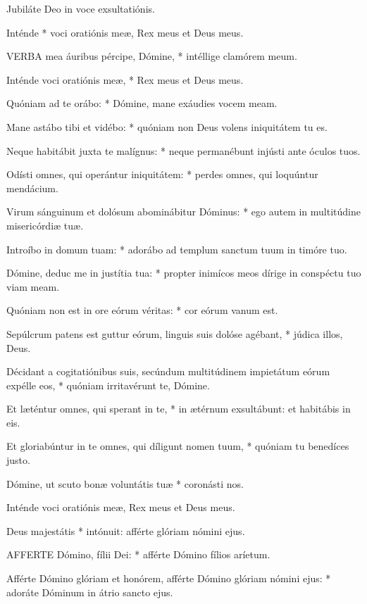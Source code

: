  Jubiláte Deo in voce exsultatiónis.

 Inténde * voci oratiónis meæ, Rex meus et Deus meus.


\lettrine[lines=2]{V}{ERBA} mea áuribus pércipe, Dómine, * intéllige clamórem meum.

Inténde voci oratiónis meæ, * Rex meus et Deus meus.

Quóniam ad te orábo: * Dómine, mane exáudies vocem meam.

Mane astábo tibi et vidébo: * quóniam non Deus volens iniquitátem tu es.

Neque habitábit juxta te malígnus: * neque permanébunt injústi ante óculos tuos.

Odísti omnes, qui operántur iniquitátem: * perdes omnes, qui loquúntur mendácium.

Virum sánguinum et dolósum abominábitur Dóminus: * ego autem in multitúdine misericórdiæ tuæ.

Introíbo in domum tuam: * adorábo ad templum sanctum tuum in timóre tuo.

Dómine, deduc me in justítia tua: * propter inimícos meos dírige in conspéctu tuo viam meam.

Quóniam non est in ore eórum véritas: * cor eórum vanum est.

Sepúlcrum patens est guttur eórum, linguis suis dolóse agébant, * júdica illos, Deus.

Décidant a cogitatiónibus suis, secúndum multitúdinem impietátum eórum expélle eos, * quóniam irritavérunt te, Dómine.

Et læténtur omnes, qui sperant in te, * in ætérnum exsultábunt: et habitábis in eis.

Et gloriabúntur in te omnes, qui díligunt nomen tuum, * quóniam tu benedíces justo.

Dómine, ut scuto bonæ voluntátis tuæ * coronásti nos.

 Inténde voci oratiónis meæ, Rex meus et Deus meus.

 Deus majestátis * intónuit: afférte glóriam nómini ejus.


\lettrine[lines=2]{A}{FFERTE} Dómino, fílii Dei: * afférte Dómino fílios aríetum.

Afférte Dómino glóriam et honórem, afférte Dómino glóriam nómini ejus: * adoráte Dóminum in átrio sancto ejus.

